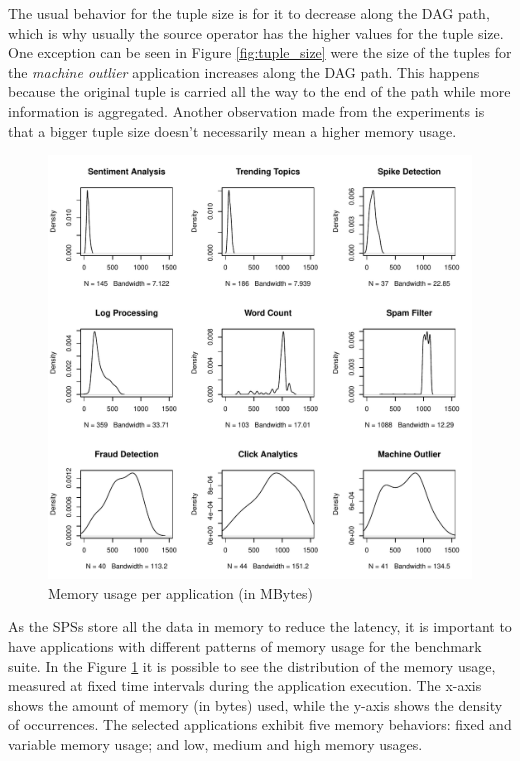 \documentclass[ppgc,diss,english]{iiufrgs}
\begin{document}
The usual behavior for the tuple size is for it to decrease along the DAG path, which is why usually the source operator has the higher values for the tuple size. One exception can be seen in Figure \ref{fig:tuple_size} were the size of the tuples for the \emph{machine outlier} application increases along the DAG path. This happens because the original tuple is carried all the way to the end of the path while more information is aggregated. Another observation made from the experiments is that a bigger tuple size doesn't necessarily mean a higher memory usage.

\begin{figure}[ht!]
    \centering
	\includegraphics[width=.8\textwidth]{images/memory_usage.pdf}
	\caption{Memory usage per application (in MBytes)}
	\label{fig:memory_usage}
\end{figure}

As the SPSs store all the data in memory to reduce the latency, it is important to have applications with different patterns of memory usage for the benchmark suite. In the Figure \ref{fig:memory_usage} it is possible to see the distribution of the memory usage, measured at fixed time intervals during the application execution. The x-axis shows the amount of memory (in bytes) used, while the y-axis shows the density of occurrences. The selected applications exhibit five memory behaviors: fixed and variable memory usage; and low, medium and high memory usages.

\end{document}
